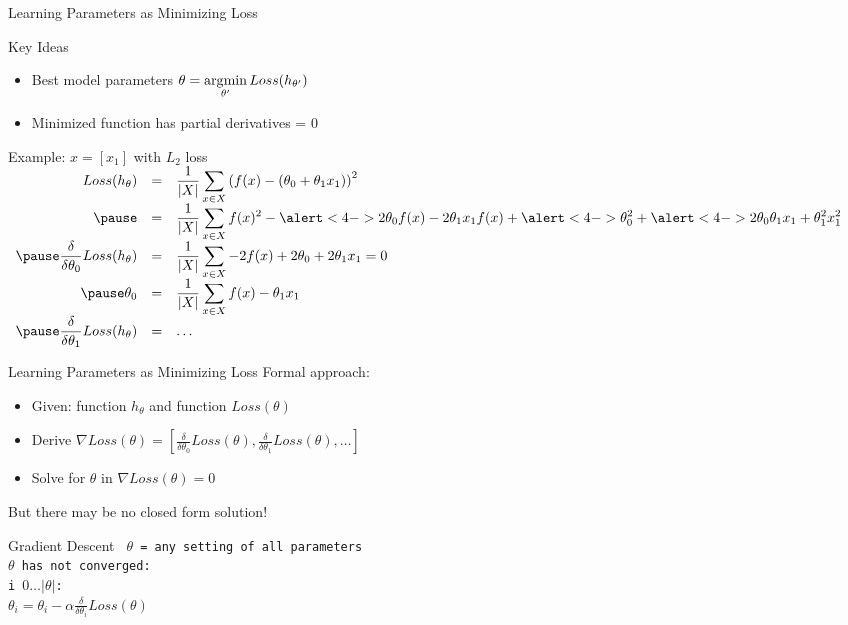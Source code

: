 \documentclass[14pt]{beamer}
\begin{document}
\begin{frame}[label=learning-via-loss]{Learning Parameters as Minimizing Loss}
\begin{block}{Key Ideas}
\begin{itemize}
\item Best model parameters $\theta = \displaystyle\operatorname*{\arg\!\min}_{\theta'} Loss(h_{\theta'})$
\item Minimized function has partial derivatives = 0
\end{itemize}
\end{block}
\pause
Example: $x = [x_1]$ with $L_2$ loss\\
\footnotesize\setlength{\arraycolsep}{0.25em}
$\begin{array}{ >{\displaystyle}r >{\displaystyle}c >{\displaystyle}l }
Loss(h_{\theta})
& = & \frac{1}{|X|}\sum_{x \in X} \left(f(x) - (\theta_0 + \theta_1 x_1)\right)^2\\
\pause
& = & \frac{1}{|X|}\sum_{x \in X} f(x)^2 - \alert<4->{ 2 \theta_0 f(x) } - 2 \theta_1 x_1 f(x) + \alert<4->{ \theta_0^2 } + \alert<4->{ 2 \theta_0 \theta_1 x_1 } + \theta_1^2 x_1^2 \\
\pause
\displaystyle\frac{\delta}{\delta\theta_0} Loss(h_{\theta})
& = & \frac{1}{|X|}\sum_{x \in X} - 2 f(x) + 2 \theta_0 + 2 \theta_1 x_1 = 0\\
\pause
\theta_0
& = & \frac{1}{|X|}\sum_{x \in X} f(x) - \theta_1 x_1 \\
\pause
\displaystyle\frac{\delta}{\delta\theta_1} Loss(h_{\theta}) & = & \ldots \\
\end{array}$
\end{frame}

\begin{frame}[label=gradient-descent]{Learning Parameters as Minimizing Loss}
Formal approach:
\begin{itemize}
\item Given: function $h_{\theta}$ and function $Loss(\theta)$
\item Derive $\nabla Loss(\theta) = [\frac{\delta}{\delta\theta_0} Loss(\theta), \frac{\delta}{\delta\theta_1} Loss(\theta), \ldots]$
\item Solve for $\theta$ in $\nabla Loss(\theta) = 0$
\end{itemize}
\pause
But there may be no closed form solution!
\pause
\begin{block}{Gradient Descent}
\tt
$\theta$ = any setting of all parameters\\
 $\theta$ has not converged:\\
\tab {} i  $0 \ldots |\theta|$:\\
\tab \tab $\displaystyle \theta_i = \theta_i - \alpha \frac{\delta}{\delta\theta_i} Loss(\theta)$
\end{block}
\end{frame}
\end{document}
